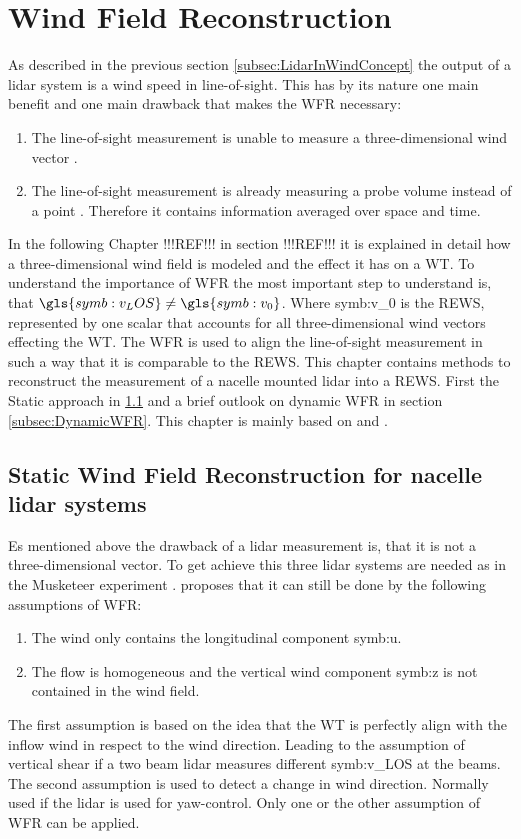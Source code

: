 \section{Wind Field Reconstruction}\label{sec:WindFieldReconstruction}
As described in the previous section \ref{subsec:LidarInWindConcept} the output of a \gls{lidar} system is a wind speed in line-of-sight. This has by its nature one main benefit and one main drawback that makes the \gls{WFR} necessary:
\begin{enumerate}
	\item The line-of-sight measurement is unable to measure a three-dimensional wind vector \cite{Schlipf2015}.
	\item The line-of-sight measurement is already measuring a probe volume instead of a point \cite{Schlipf2015}. Therefore it contains information averaged over space and time. 
\end{enumerate}
In the following Chapter !!!REF!!! in section !!!REF!!! it is explained in detail how a three-dimensional wind field is modeled and the effect it has on a \gls{WT}. To understand the importance of \gls{WFR} the most important step to understand is, that $\gls{symb:v_LOS} \neq \gls{symb:v_0}$. Where \gls{symb:v_0} is the \gls{REWS}, represented by one scalar that accounts for all three-dimensional wind vectors effecting the \gls{WT}. The \gls{WFR} is used to align the line-of-sight measurement in such a way that it is comparable to the \gls{REWS}. 
This chapter contains methods to reconstruct the measurement of a nacelle mounted \gls{lidar} into a \gls{REWS}. First the Static approach in \ref{subsec:StaticWFR} and a brief outlook on dynamic \gls{WFR} in section \ref{subsec:DynamicWFR}. This chapter is mainly based on \cite{Schlipf2011} and \cite{Schlipf2012}.

\subsection{Static Wind Field Reconstruction for nacelle lidar systems}\label{subsec:StaticWFR}
Es mentioned above the drawback of a \gls{lidar} measurement is, that it is not a three-dimensional vector. To get achieve this three \gls{lidar} systems are needed as in the Musketeer experiment \cite{Mikkelsen2008}. \cite{Schlipf2011} proposes that it can still be done by the following assumptions of \gls{WFR}:
\begin{enumerate}
	\item The wind only contains the longitudinal component \gls{symb:u}.
	\item The flow is homogeneous and the vertical wind component \gls{symb:z} is not contained in the wind field. 
\end{enumerate}
The first assumption is based on the idea that the \gls{WT} is perfectly align with the inflow wind in respect to the wind direction. Leading to the assumption of vertical shear if a two beam \gls{lidar} measures different \gls{symb:v_LOS} at the beams. The second assumption is used to detect a change in wind direction. Normally used if the \gls{lidar} is used for yaw-control. Only one or the other assumption of \gls{WFR} can be applied.

